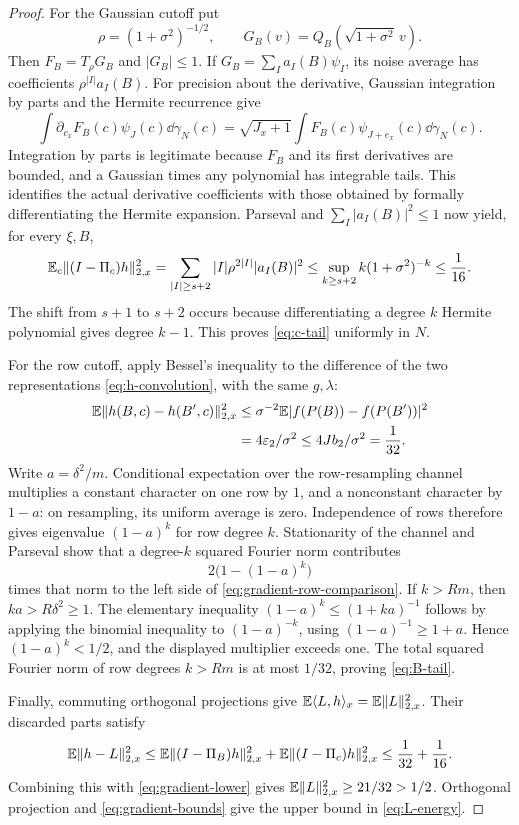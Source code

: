 \begin{proof}
For the Gaussian cutoff put
\[
 \rho=(1+\sigma^2)^{-1/2},\qquad
 G_B(v)=Q_B(\sqrt{1+\sigma^2}\,v).
\]
Then $F_B=T_\rho G_B$ and $|G_B|\le1$. If
$G_B=\sum_I a_I(B)\psi_I$, its noise average has coefficients
$\rho^{|I|}a_I(B)$. For precision about the derivative, Gaussian
integration by parts and the Hermite recurrence give
\[
 \int\partial_{c_x}F_B(c)\psi_J(c)\dd\gamma_N(c)
 =\sqrt{J_x+1}\int F_B(c)\psi_{J+e_x}(c)\dd\gamma_N(c).
\]
Integration by parts is legitimate because $F_B$ and its first
derivatives are bounded, and a Gaussian times any polynomial has
integrable tails. This identifies the actual derivative coefficients
with those obtained by formally differentiating the Hermite expansion.
Parseval and $\sum_I|a_I(B)|^2\le1$ now yield, for every $\xi,B$,
\[
 \mathbb E_c\lVert(I-\Pi_c)h\rVert_{2,x}^2
 =\sum_{|I|\ge s+2}|I|\rho^{2|I|}|a_I(B)|^2
 \le\sup_{k\ge s+2} k(1+\sigma^2)^{-k}\le\frac1{16}.
\]
The shift from $s+1$ to $s+2$ occurs because differentiating a degree
$k$ Hermite polynomial gives degree $k-1$. This proves \eqref{eq:c-tail}
uniformly in $N$.

For the row cutoff, apply Bessel's inequality to the difference of the
two representations \eqref{eq:h-convolution}, with the same $g,\lambda$:
\begin{align}
 \mathbb E\lVert h(B,c)-h(B',c)\rVert_{2,x}^2
 &\le\sigma^{-2}\mathbb E|f(P(B))-f(P(B'))|^2\notag\\
 &=4\varepsilon_2/\sigma^2\le4Jb_2/\sigma^2=\frac1{32}.
 \label{eq:gradient-row-comparison}
\end{align}
Write $a=\delta^2/m$. Conditional expectation over the row-resampling
channel multiplies a constant character on one row by $1$, and a
nonconstant character by $1-a$: on resampling, its uniform average is
zero. Independence of rows therefore gives eigenvalue $(1-a)^k$ for
row degree $k$. Stationarity of the channel and Parseval show that a
degree-$k$ squared Fourier norm contributes
\[
 2\bigl(1-(1-a)^k\bigr)
\]
times that norm to the left side of
\eqref{eq:gradient-row-comparison}. If $k>Rm$, then
$ka>R\delta^2\ge1$. The elementary inequality
$(1-a)^k\le(1+ka)^{-1}$ follows by applying the binomial inequality to
$(1-a)^{-k}$, using $(1-a)^{-1}\ge1+a$. Hence $(1-a)^k<1/2$, and the
displayed multiplier exceeds one. The total squared Fourier norm of
row degrees $k>Rm$ is at most $1/32$, proving \eqref{eq:B-tail}.

Finally, commuting orthogonal projections give
$\mathbb E\langle L,h\rangle_x=\mathbb E\lVert L\rVert_{2,x}^2$. Their discarded parts satisfy
\[
 \mathbb E\lVert h-L\rVert_{2,x}^2
 \le\mathbb E\lVert(I-\Pi_B)h\rVert_{2,x}^2
     +\mathbb E\lVert(I-\Pi_c)h\rVert_{2,x}^2
 \le\frac1{32}+\frac1{16}.
\]
Combining this with \eqref{eq:gradient-lower} gives
$\mathbb E\lVert L\rVert_{2,x}^2\ge21/32>1/2$. Orthogonal projection and
\eqref{eq:gradient-bounds} give the upper bound in
\eqref{eq:L-energy}.
\end{proof}

